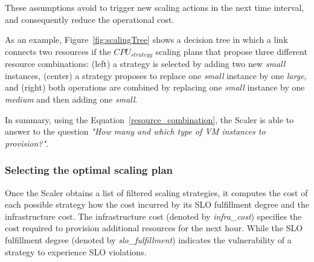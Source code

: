 These assumptions avoid to trigger new scaling actions in the next time interval, and consequently reduce the operational cost. 

As an example, Figure~\ref{fig:scalingTree} shows a decision tree in which a link connects two resources if the \emph{$CPU_{strategy}$}  scaling plans that propose three different resource combinations: (left) a strategy is selected by adding two new \emph{small} instances, (center) a strategy proposes to replace one \emph{small} instance by one \emph{large}, and (right) both operations are combined by replacing one \emph{small} instance by one \emph{medium} and then adding one \emph{small}. 


In summary, using the Equation~\ref{resource_combination}, the Scaler is able to answer to the question \emph{"How many and which type of VM instances to provision?"}.


\subsubsection{Selecting the optimal scaling plan}



Once the Scaler obtains a list of filtered scaling strategies, it computes the cost of each possible strategy how the cost incurred by its SLO fulfillment degree and the infrastructure cost. The infrastructure cost (denoted by \emph{infra\_cost}) specifies the cost required to provision additional resources for the next hour. While the SLO fulfillment degree (denoted by \emph{slo\_fulfillment}) indicates the vulnerability of a strategy to experience SLO violations. 


